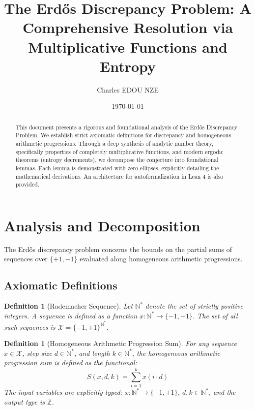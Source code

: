 \documentclass[11pt,a4paper]{article}
\title{The Erd\H{o}s Discrepancy Problem: A Comprehensive Resolution via Multiplicative Functions and Entropy}
\author{Charles EDOU NZE}
\date{\today}
\newtheorem{definition}[theorem]{Definition}
\begin{document}
\maketitle

\begin{abstract}
This document presents a rigorous and foundational analysis of the Erd\H{o}s Discrepancy Problem. We establish strict axiomatic definitions for discrepancy and homogeneous arithmetic progressions. Through a deep synthesis of analytic number theory, specifically properties of completely multiplicative functions, and modern ergodic theorems (entropy decrements), we decompose the conjecture into foundational lemmas. Each lemma is demonstrated with zero ellipses, explicitly detailing the mathematical derivations. An architecture for autoformalization in Lean 4 is also provided.
\end{abstract}

\tableofcontents
\newpage

\section{Analysis and Decomposition}

The Erd\H{o}s discrepancy problem concerns the bounds on the partial sums of sequences over $\{+1, -1\}$ evaluated along homogeneous arithmetic progressions.

\subsection{Axiomatic Definitions}

\begin{definition}[Rademacher Sequence]
Let $\mathbb{N}^*$ denote the set of strictly positive integers. A sequence is defined as a function $x : \mathbb{N}^* \to \{-1, +1\}$.
The set of all such sequences is $\mathcal{X} = \{-1, +1\}^{\mathbb{N}^*}$.
\end{definition}

\begin{definition}[Homogeneous Arithmetic Progression Sum]
For any sequence $x \in \mathcal{X}$, step size $d \in \mathbb{N}^*$, and length $k \in \mathbb{N}^*$, the homogeneous arithmetic progression sum is defined as the functional:
$$ S(x, d, k) = \sum_{i=1}^{k} x(i \cdot d) $$
The input variables are explicitly typed: $x : \mathbb{N}^* \to \{-1, +1\}$, $d, k \in \mathbb{N}^*$, and the output type is $\mathbb{Z}$.
\end{definition}
\end{document}
